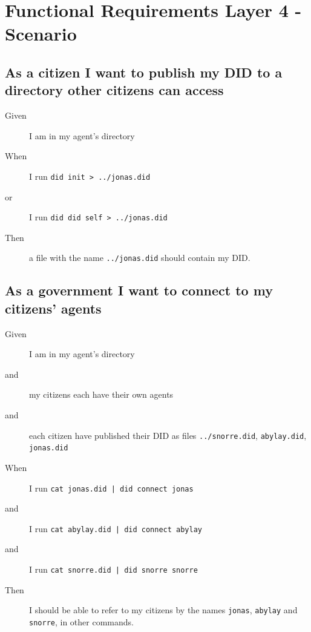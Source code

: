 \newpage



\section{Functional Requirements Layer 4 - Scenario}



\subsection{As a citizen I want to publish my DID to a directory other citizens can access}
\begin{description}
    \item[Given] I am in my agent's directory
    \item[When] I run \texttt{did init > ../jonas.did}
    \item[or] I run \texttt{did did self > ../jonas.did}
    \item[Then] a file with the name \texttt{../jonas.did} should contain my DID.
\end{description}



\subsection{As a government I want to connect to my citizens' agents}
\begin{description}
    \item[Given] I am in my agent's directory
    \item[and] my citizens each have their own agents
    \item[and] each citizen have published their DID as files \texttt{../snorre.did}, \texttt{abylay.did}, \texttt{jonas.did}
    \item[When] I run \texttt{cat jonas.did | did connect jonas}
    \item[and] I run \texttt{cat abylay.did | did connect abylay}
    \item[and] I run \texttt{cat snorre.did | did snorre snorre}
    \item[Then] I should be able to refer to my citizens by the names \texttt{jonas}, \texttt{abylay} and \texttt{snorre}, in other commands.
\end{description}



